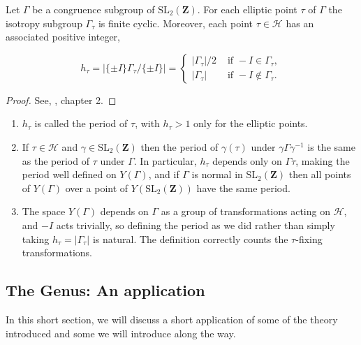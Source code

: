 \begin{proposition}\label{2.7.11}
      Let $\Gamma$ be a congruence subgroup of $\mathrm{SL}_{2}(\mathbf{Z})$. For each elliptic point $\tau$ of $\Gamma$ the isotropy subgroup $\Gamma_{\tau}$ is finite cyclic. Moreover, each point $\tau \in \mathcal{H}$ has an associated positive integer,

$$
h_{\tau}=\left|\{ \pm I\} \Gamma_{\tau} /\{ \pm I\}\right|= \begin{cases}\left|\Gamma_{\tau}\right| / 2 & \text { if }-I \in \Gamma_{\tau}, \\ \left|\Gamma_{\tau}\right| & \text { if }-I \notin \Gamma_{\tau} .\end{cases}
$$

\end{proposition}

\begin{proof}
  See, \cite{diamond2005first}, chapter 2. 
\end{proof}
\begin{remark}
    
\begin{enumerate}
    \item $h_{\tau}$ is called the period of $\tau$, with $h_{\tau}>1$ only for the elliptic points.
    \item If $\tau \in \mathcal{H}$ and $\gamma \in \mathrm{SL}_{2}(\mathbf{Z})$ then the period of $\gamma(\tau)$ under $\gamma \Gamma \gamma^{-1}$ is the same as the period of $\tau$ under $\Gamma$. In particular, $h_{\tau}$ depends only on $\Gamma \tau$, making the period well defined on $Y(\Gamma)$, and if $\Gamma$ is normal in $\mathrm{SL}_{2}(\mathbf{Z})$ then all points of $Y(\Gamma)$ over a point of $Y\left(\mathrm{SL}_{2}(\mathbf{Z})\right)$ have the same period.
    \item   The space $Y(\Gamma)$ depends on $\Gamma$ as a group of transformations acting on $\mathcal{H}$, and $-I$ acts trivially, so defining the period as we did rather than simply taking $h_{\tau}=\left|\Gamma_{\tau}\right|$ is natural. The definition correctly counts the $\tau$-fixing transformations.
\end{enumerate}
\end{remark}

\subsection{The Genus: An application}

In this short section, we will discuss a short application of some of the theory introduced and some we will introduce along the way. \\

